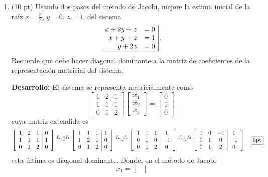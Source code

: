 \documentclass[11pt]{article}
\begin{document}
\begin{enumerate}
\item
(10 pt) Usando dos pasos del m\'etodo de Jacobi, mejore la estima inicial de la ra\'iz $x=\frac{3}{2}$, $y=0$, $z=1$, del sistema
$$
\begin{array}{rl|}
x+2y+z	&=0\\
x+y+z	&=1\\
y+2z		&=0\\
\hline
\end{array}\,.
$$
Recuerde que debe hacer diagonal dominante a la matriz de coeficientes de la representaci\'on matricial del sistema.

\textbf{Desarrollo:} El sistema se representa matricialmente como
$$
\begin{bmatrix}
1 & 2&1 \\
1 & 1& 1\\
0 &1 &2
\end{bmatrix}
\begin{bmatrix}
x_1\\x_2\\x_3
\end{bmatrix}
=
\begin{bmatrix}
0\\1\\0
\end{bmatrix}
$$
cuya matriz extendida es
$$
\left[
\begin{array}{ccc|c}
1 & 2 & 1 & 0 \\
1 & 1 & 1 & 1 \\
0 & 1 & 2 & 0
\end{array}\right]
\stackrel{f_2\rightarrow f_1}{\sim}
\left[
\begin{array}{ccc|c}
1 & 1 & 1 & 1 \\
1 & 2 & 1 & 0 \\
0 & 1 & 2 & 0
\end{array}\right]
\stackrel{f_2- f_1}{\sim}
\left[
\begin{array}{ccc|c}
1 & 1 & 1 & 1 \\
0 & 1 & 0 & -1 \\
0 & 1 & 2 & 0
\end{array}\right]
\stackrel{f_1- f_3}{\sim}
\left[
\begin{array}{ccc|c}
1 & 0 & -1 & 1 \\
0 & 1 & 0 & -1 \\
0 & 1 & 2 & 0
\end{array}\right] \quad \fbox{5pt}
$$
esta \'ultima es diagonal dominante. Donde, en el m\'etodo de Jacobi
$$
x_1=
\begin{bmatrix}

\end{bmatrix}$$
\end{enumerate}
\end{document}
